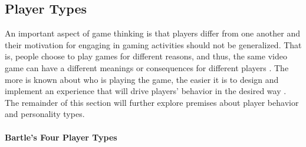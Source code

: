 \subsection{Player Types}
An important aspect of game thinking is that players differ from one another and their motivation for engaging in gaming activities should not be generalized. That is, people choose to play games for different reasons, and thus, the same video game can have a different meanings or consequences for different players \cite{yee2006motivations}. The more is known about who is playing the game, the easier it is to design and implement an experience that will drive players' behavior in the desired way \cite{zichermann2011gamification}. The  remainder  of  this section will further explore premises about player behavior and personality types. 

\paragraph{Bartle's Four Player Types}

